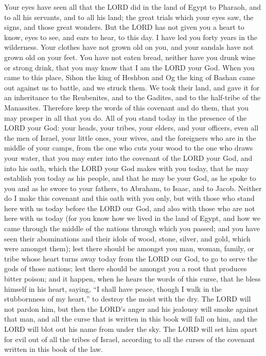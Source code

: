 Your eyes have seen all that the LORD did in the land of Egypt to
Pharaoh, and to all his servants, and to all his land; 
the great trials which your eyes saw, the signs, and those great
wonders.  But the LORD has not given you a heart to know,
eyes to see, and ears to hear, to this day.  I have led
you forty years in the wilderness. Your clothes have not grown old on
you, and your sandals have not grown old on your feet. 
You have not eaten bread, neither have you drunk wine or strong drink,
that you may know that I am the LORD your God.  When you
came to this place, Sihon the king of Heshbon and Og the king of Bashan
came out against us to battle, and we struck them.  We
took their land, and gave it for an inheritance to the Reubenites, and
to the Gadites, and to the half-tribe of the Manassites. 
Therefore keep the words of this covenant and do them, that you may
prosper in all that you do.  All of you stand today in
the presence of the LORD your God: your heads, your tribes, your elders,
and your officers, even all the men of Israel,  your
little ones, your wives, and the foreigners who are in the middle of
your camps, from the one who cuts your wood to the one who draws your
water,  that you may enter into the covenant of the LORD
your God, and into his oath, which the LORD your God makes with you
today,  that he may establish you today as his people,
and that he may be your God, as he spoke to you and as he swore to your
fathers, to Abraham, to Isaac, and to Jacob.  Neither do
I make this covenant and this oath with you only,  but
with those who stand here with us today before the LORD our God, and
also with those who are not here with us today  (for you
know how we lived in the land of Egypt, and how we came through the
middle of the nations through which you passed;  and you
have seen their abominations and their idols of wood, stone, silver, and
gold, which were amongst them);  lest there should be
amongst you man, woman, family, or tribe whose heart turns away today
from the LORD our God, to go to serve the gods of those nations; lest
there should be amongst you a root that produces bitter poison;
 and it happen, when he hears the words of this curse,
that he bless himself in his heart, saying, ``I shall have peace, though
I walk in the stubbornness of my heart,'' to destroy the moist with the
dry.  The LORD will not pardon him, but then the LORD's
anger and his jealousy will smoke against that man, and all the curse
that is written in this book will fall on him, and the LORD will blot
out his name from under the sky.  The LORD will set him
apart for evil out of all the tribes of Israel, according to all the
curses of the covenant written in this book of the law.

